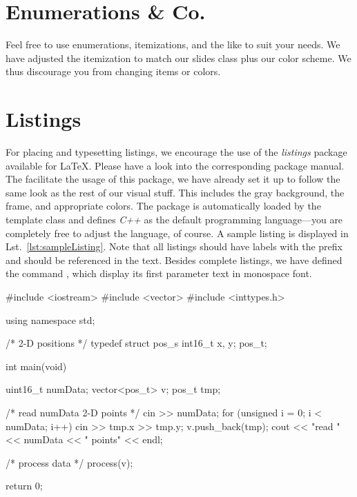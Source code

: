 \section{Enumerations \& Co.}\label{sec:enumerations}

Feel free to use enumerations, itemizations, and the like to suit your needs. We have adjusted the itemization to match our slides class plus our color scheme. We thus discourage you from changing items or colors.



\section{Listings}\label{sec:listings}

For placing and typesetting listings, we encourage the use of the \emph{listings} package available for \LaTeX. Please have a look into the corresponding package manual. The facilitate the usage of this package, we have already set it up to follow the same look as the rest of our visual stuff. This includes the gray background, the frame, and appropriate colors. The package is automatically loaded by the template class and defines \emph{C++} as the default programming language---you are completely free to adjust the language, of course. A sample listing is displayed in Lst.~\ref{lst:sampleListing}. Note that all listings should have labels with the prefix  and should be referenced in the text. Besides complete listings, we have defined the command , which display its first parameter text in monospace font.

\begin{tuhhlisting}[label=lst:sampleListing,caption={A simple C++ program for reading in positions},language=C++]
#include <iostream>                                                                       
#include <vector>                                                                         
#include <inttypes.h>                                                                     

using namespace std;

/* 2-D positions */
typedef struct pos_s {
        int16_t  x, y;
} pos_t;

int main(void)
{
        uint16_t       numData;
        vector<pos_t>  v;
        pos_t          tmp;

        /* read numData 2-D points */
        cin >> numData;
        for (unsigned i = 0; i < numData; i++) {
                cin >> tmp.x >> tmp.y;
                v.push_back(tmp);
        }
        cout << "read " << numData << " points" << endl;

        /* process data */
        process(v);

        return 0;
}
\end{tuhhlisting}
